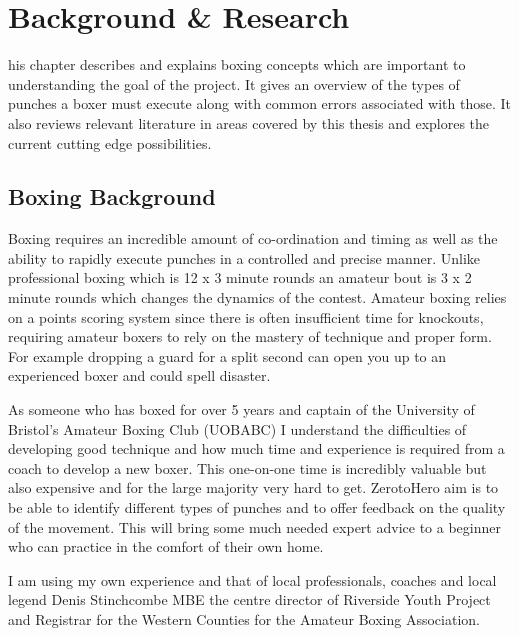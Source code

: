 %
%
\let\textcircled=\pgftextcircled
\chapter{Background \& Research}
\label{chap:intro}

his chapter describes and explains boxing concepts which are important to understanding the goal of the project. It gives an overview of the types of punches a boxer must execute along with common errors associated with those. It also reviews relevant literature in areas covered by this thesis and explores the current cutting edge possibilities.
\section{Boxing Background}
\label{sec:sec01}
Boxing requires an incredible amount of co-ordination and timing as well as the ability to rapidly execute punches in a controlled and precise manner. Unlike professional boxing which is 12 x 3 minute rounds an amateur bout is 3 x 2 minute rounds which changes the dynamics of the contest. Amateur boxing relies on a points scoring system since there is often insufficient time for knockouts, requiring amateur boxers to rely on the mastery of technique and proper form. For example dropping a guard for a split second can open you up to an experienced boxer and could spell disaster.

As someone who has boxed for over 5 years and captain of the University of Bristol's Amateur Boxing Club (UOBABC) I understand the difficulties of developing good technique and how much time and experience is required from a coach to develop a new boxer. This one-on-one time is incredibly valuable but also expensive and for the large majority very hard to get. ZerotoHero aim is to be able to identify different types of punches and to offer feedback on the quality of the movement. This will bring some much needed expert advice to a beginner who can practice in the comfort of their own home.

I am using my own experience and that of local professionals, coaches and local legend Denis Stinchcombe MBE the centre director of Riverside Youth Project and Registrar for the Western Counties for the Amateur Boxing Association.
 

